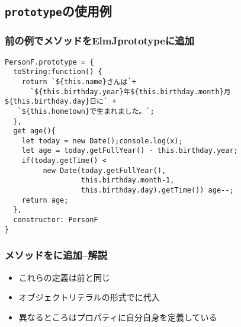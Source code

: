  \subsection{\protect\texttt{prototype}の使用例}
\begin{frame}[containsverbatim]
 \frametitle{前の例でメソッドをElmJ{prototype}に追加}
{\scriptsize
\begin{Verbatim}
PersonF.prototype = {
  toString:function() {
    return `${this.name}さんは`+
      `${this.birthday.year}年${this.birthday.month}月${this.birthday.day}日に` +
   `${this.hometown}で生まれました。`;
  },
  get age(){
    let today = new Date();console.log(x);
    let age = today.getFullYear() - this.birthday.year;
    if(today.getTime() <
         new Date(today.getFullYear(),
                  this.birthday.month-1,
                  this.birthday.day).getTime()) age--;
    return age;
  },
  constructor: PersonF
}
\end{Verbatim}
}
\end{frame}
\begin{frame}[containsverbatim]
 \frametitle{メソッドをに追加--解説}
 \begin{itemize}
  \item これらの定義は前と同じ
  \item オブジェクトリテラルの形式でに代入
  \item 異なるところはプロパティに自分自身を定義している
 \end{itemize}
\end{frame}

